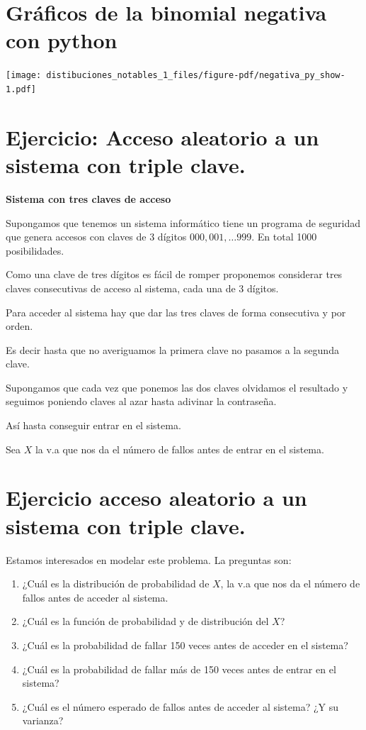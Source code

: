 \documentclass[
  letterpaper,
  DIV=11,
  numbers=noendperiod]{scrreprt}
\providecommand{\tightlist}{%
  \setlength{\itemsep}{0pt}\setlength{\parskip}{0pt}}\usepackage{longtable,booktabs,array}
\begin{document}
\section{Gráficos de la binomial negativa con
python}\label{gruxe1ficos-de-la-binomial-negativa-con-python-2}

\begin{center}
\texttt{[image: distibuciones\_notables\_1\_files/figure-pdf/negativa\_py\_show-1.pdf]}
\end{center}

\section{Ejercicio: Acceso aleatorio a un sistema con triple
clave.}\label{ejercicio-acceso-aleatorio-a-un-sistema-con-triple-clave.}

\textbf{Sistema con tres claves de acceso}

Supongamos que tenemos un sistema informático tiene un programa de
seguridad que genera accesos con claves de 3 dígitos
\(000,001,\ldots 999\). En total 1000 posibilidades.

Como una clave de tres dígitos es fácil de romper proponemos considerar
tres claves consecutivas de acceso al sistema, cada una de 3 dígitos.

Para acceder al sistema hay que dar las tres claves de forma consecutiva
y por orden.

Es decir hasta que no averiguamos la primera clave no pasamos a la
segunda clave.

Supongamos que cada vez que ponemos las dos claves olvidamos el
resultado y seguimos poniendo claves al azar hasta adivinar la
contraseña.

Así hasta conseguir entrar en el sistema.

Sea \(X\) la v.a que nos da el número de fallos antes de entrar en el
sistema.

\section{Ejercicio acceso aleatorio a un sistema con triple
clave.}\label{ejercicio-acceso-aleatorio-a-un-sistema-con-triple-clave.-1}

Estamos interesados en modelar este problema. La preguntas son:

\begin{enumerate}
\def\labelenumi{\arabic{enumi}.}
\tightlist
\item
  ¿Cuál es la distribución de probabilidad de \(X\), la v.a que nos da
  el número de fallos antes de acceder al sistema.
\item
  ¿Cuál es la función de probabilidad y de distribución del \(X\)?
\item
  ¿Cuál es la probabilidad de fallar 150 veces antes de acceder en el
  sistema?
\item
  ¿Cuál es la probabilidad de fallar más de 150 veces antes de entrar en
  el sistema?
\item
  ¿Cuál es el número esperado de fallos antes de acceder al sistema? ¿Y
  su varianza?
\end{enumerate}
\end{document}
